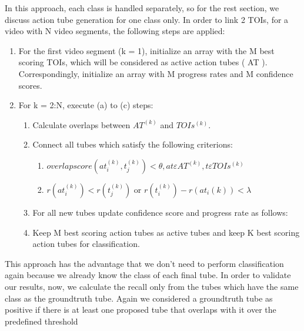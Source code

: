 In this approach, each class is handled separately, so for the rest section, we discuss action tube generation for one class only. In order to link 2 TOIs, for
a video with N video segments, the following steps are applied:
\begin{enumerate}
\item For the first video segment (k = 1), initialize an array with the M best scoring TOIs, which will be considered as active action tubes ( AT ).
  Correspondingly, initialize an array with M progress rates  and M confidence scores.
\item For k = 2:N, execute (a) to (c) steps:
  \begin{enumerate}
  \item Calculate overlaps between $ AT^{(k)} $ and $ TOIs^{(k)}. $
  \item Connect all tubes which satisfy the following criterions:
    \begin{enumerate}
    \item $ overlap score(at_i^{(k)},t_j^{(k)})   < \theta, 
      at  \varepsilon AT^{(k)}, t \varepsilon TOIs^{(k)}  $
    \item $r(at_i^{(k)}) < r(t_j^{(k)}) $ or 
      $r(t_i^{(k)}) - r(at_i{(k)}) < \lambda $
    \end{enumerate}
    
  \item For all new tubes update confidence score and progress rate as follows:
  \item Keep M best scoring action tubes as active tubes and keep K best scoring action tubes for classification.
  \end{enumerate}
  
\end{enumerate}

This approach has the advantage that we don't need to perform classification again because we already know the class of
each final tube. In order to validate our results, now, we calculate the recall only from the tubes which have the same
class as the groundtruth tube. Again we considered a groundtruth  tube as positive if there is at least one proposed  tube
that overlaps with it over the predefined threshold

